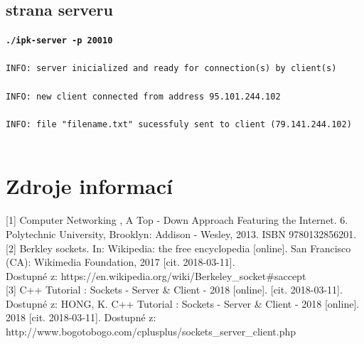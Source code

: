 \documentclass[a4paper, 12pt]{article}
\begin{document}
\subsection*{strana serveru}
\textbf{\texttt{./ipk-server -p 20010}}\\ \\
\texttt{INFO: server inicialized and ready for connection(s) by client(s) }\\ \\
\texttt{INFO: new client connected from address 95.101.244.102}\\ \\
\texttt{INFO: file "filename.txt" sucessfuly sent to client (79.141.244.102)} \\ \\ 


\section{Zdroje informací}
\setlength\parindent{0pt}
[1] Computer Networking , A Top - Down Approach Featuring the Internet. 6. Polytechnic University, Brooklyn: Addison - Wesley, 2013. ISBN 9780132856201. \\

[2] Berkley sockets. In: Wikipedia: the free encyclopedia [online]. San Francisco (CA): Wikimedia Foundation, 2017 [cit. 2018-03-11]. \\Dostupné z: https://en.wikipedia.org/wiki/Berkeley\_socket\#saccept  \\

[3] C++ Tutorial : Sockets - Server \& Client - 2018 [online]. [cit. 2018-03-11]. Dostupné z: HONG, K. C++ Tutorial : Sockets - Server \& Client - 2018 [online]. 2018 [cit. 2018-03-11]. Dostupné z: http://www.bogotobogo.com/cplusplus/sockets\_server\_client.php
\end{document}
